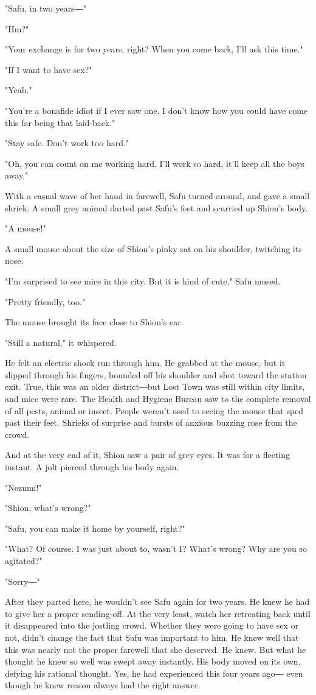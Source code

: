 "Safu, in two years―"

"Hm?"

"Your exchange is for two years, right? When you come back, I'll ask
this time."

"If I want to have sex?"

"Yeah."

"You're a bonafide idiot if I ever saw one. I don't know how you could
have come this far being that laid-back."

"Stay safe. Don't work too hard."

"Oh, you can count on me working hard. I'll work so hard, it'll keep all
the boys away."

With a casual wave of her hand in farewell, Safu turned around, and gave
a small shriek. A small grey animal darted past Safu's feet and scurried
up Shion's body.

"A mouse!"

A small mouse about the size of Shion's pinky sat on his shoulder,
twitching its nose.

"I'm surprised to see mice in this city. But it is kind of cute," Safu
mused.

"Pretty friendly, too."

The mouse brought its face close to Shion's ear.

"Still a natural," it whispered.

He felt an electric shock run through him. He grabbed at the mouse, but
it slipped through his fingers, bounded off his shoulder and shot toward
the station exit. True, this was an older district―but Lost Town was
still within city limits, and mice were rare. The Health and Hygiene
Bureau saw to the complete removal of all pests, animal or insect.
People weren't used to seeing the mouse that sped past their feet.
Shrieks of surprise and bursts of anxious buzzing rose from the crowd.

And at the very end of it, Shion saw a pair of grey eyes. It was for a
fleeting instant. A jolt pierced through his body again.

"Nezumi!"

"Shion, what's wrong?"

"Safu, you can make it home by yourself, right?"

"What? Of course. I was just about to, wasn't I? What's wrong? Why are
you so agitated?"

"Sorry―"

After they parted here, he wouldn't see Safu again for two years. He
knew he had to give her a proper sending-off. At the very least, watch
her retreating back until it disappeared into the jostling crowd.
Whether they were going to have sex or not, didn't change the fact that
Safu was important to him. He knew well that this was nearly not the
proper farewell that she deserved. He knew. But what he thought he knew
so well was swept away instantly. His body moved on its own, defying his
rational thought. Yes, he had experienced this four years ago― even
though he knew reason always had the right answer.

